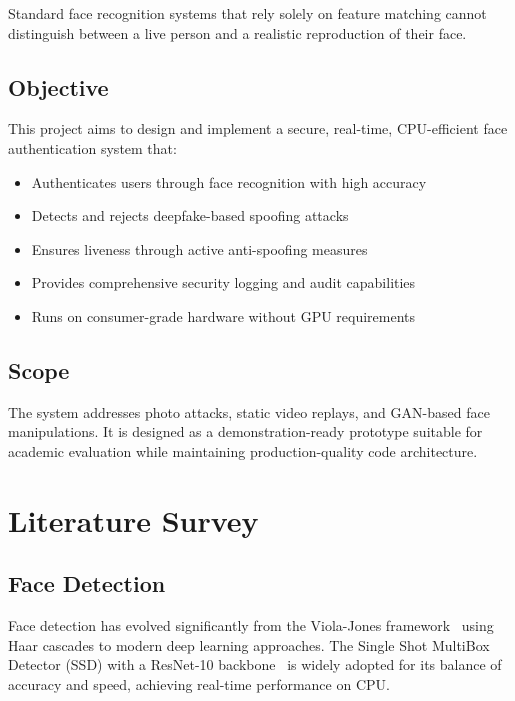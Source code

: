 \documentclass[conference,10pt]{IEEEtran}
\begin{document}
Standard face recognition systems that rely solely on feature matching cannot distinguish between a live person and a realistic reproduction of their face.

\subsection{Objective}

This project aims to design and implement a secure, real-time, CPU-efficient face authentication system that:
\begin{itemize}
    \item Authenticates users through face recognition with high accuracy
    \item Detects and rejects deepfake-based spoofing attacks
    \item Ensures liveness through active anti-spoofing measures
    \item Provides comprehensive security logging and audit capabilities
    \item Runs on consumer-grade hardware without GPU requirements
\end{itemize}

\subsection{Scope}

The system addresses photo attacks, static video replays, and GAN-based face manipulations. It is designed as a demonstration-ready prototype suitable for academic evaluation while maintaining production-quality code architecture.


\section{Literature Survey}

\subsection{Face Detection}

Face detection has evolved significantly from the Viola-Jones framework~\cite{viola2001} using Haar cascades to modern deep learning approaches. The Single Shot MultiBox Detector (SSD) with a ResNet-10 backbone~\cite{liu2016ssd} is widely adopted for its balance of accuracy and speed, achieving real-time performance on CPU.
\end{document}
